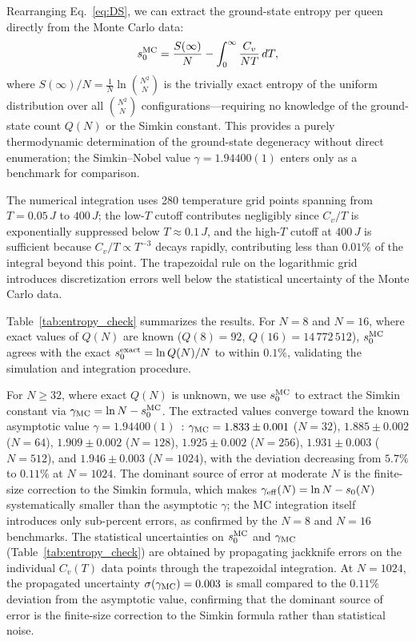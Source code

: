 \documentclass[aps, pre, reprint, amsmath, amssymb, superscriptaddress, floatfix]{revtex4-2}
\begin{document}
Rearranging Eq.~\eqref{eq:DS}, we can extract the ground-state
entropy per queen directly from the Monte Carlo data:
\begin{equation}
  s_0^{\rm MC}
  = \frac{S(\infty)}{N} - \int_0^\infty \frac{C_v}{NT}\,dT,
  \label{eq:s0_MC}
\end{equation}
where $S(\infty)/N = \frac{1}{N}\ln\binom{N^2}{N}$ is the trivially
exact entropy of the uniform distribution over all $\binom{N^2}{N}$
configurations---requiring no knowledge of the ground-state count
$Q(N)$ or the Simkin constant.
This provides a purely thermodynamic determination of the
ground-state degeneracy without direct enumeration; the Simkin--Nobel
value $\gamma = 1.94400(1)$ enters only as a benchmark for comparison.

The numerical integration uses 280 temperature grid points
spanning from $T = 0.05\,J$ to $400\,J$; the low-$T$
cutoff contributes negligibly since $C_v/T$ is exponentially
suppressed below $T \approx 0.1\,J$, and the high-$T$ cutoff at
$400\,J$ is sufficient because $C_v/T \propto T^{-3}$ decays
rapidly, contributing less than $0.01\%$ of the integral beyond
this point.  The trapezoidal rule on the logarithmic grid introduces
discretization errors well below the statistical uncertainty of the
Monte Carlo data.

Table~\ref{tab:entropy_check} summarizes the results.
For $N = 8$ and $N = 16$, where exact values of $Q(N)$ are known
($Q(8) = 92$, $Q(16) = 14\,772\,512$), $s_0^{\rm MC}$ agrees with
the exact $s_0^{\rm exact} = \ln Q(N)/N$ to within $0.1\%$,
validating the simulation and integration procedure.

For $N \ge 32$, where exact $Q(N)$ is unknown, we use $s_0^{\rm MC}$
to extract the Simkin constant via
$\gamma_{\rm MC} = \ln N - s_0^{\rm MC}$.
The extracted values converge toward the known
asymptotic value $\gamma = 1.94400(1)$~\cite{Nobel2023}:
$\gamma_{\rm MC} = 1.833 \pm 0.001$ ($N = 32$), $1.885 \pm 0.002$ ($N = 64$),
$1.909 \pm 0.002$ ($N = 128$), $1.925 \pm 0.002$ ($N = 256$),
$1.931 \pm 0.003$ ($N = 512$), and $1.946 \pm 0.003$ ($N = 1024$), with the deviation
decreasing from $5.7\%$ to $0.11\%$ at $N = 1024$.
The dominant source of error at moderate $N$ is the finite-size
correction to the Simkin formula, which makes $\gamma_{\rm eff}(N)
= \ln N - s_0(N)$ systematically smaller than the asymptotic
$\gamma$; the MC integration itself introduces only sub-percent
errors, as confirmed by the $N = 8$ and $N = 16$ benchmarks.
The statistical uncertainties on $s_0^{\rm MC}$ and $\gamma_{\rm MC}$
(Table~\ref{tab:entropy_check}) are obtained by propagating jackknife
errors on the individual $C_v(T)$ data points through the trapezoidal
integration.  At $N = 1024$, the propagated uncertainty
$\sigma(\gamma_{\rm MC}) = 0.003$ is small compared to the $0.11\%$
deviation from the asymptotic value, confirming that the dominant
source of error is the finite-size correction to the Simkin formula
rather than statistical noise.
\end{document}
